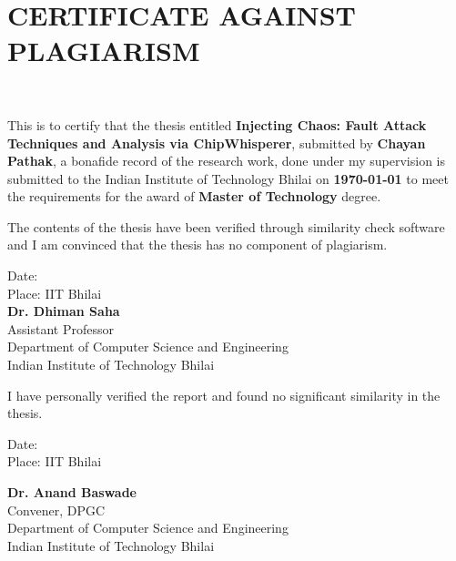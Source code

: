 \chapter[Approval]{CERTIFICATE AGAINST PLAGIARISM}


\hspace{0pt plus 1filll} \\
  
 \begin{Spacing}{1}
 	\sffamily
 	
\noindent 	
This is to certify that the thesis entitled \textbf{Injecting Chaos: Fault Attack Techniques and Analysis via ChipWhisperer}, submitted by \textbf{Chayan Pathak}, a bonafide record of the research work, done under my supervision is submitted to the Indian Institute of Technology Bhilai on {\bfseries \today} to meet the requirements for the award of {\bfseries Master of Technology} degree.

The contents of the thesis have been verified through similarity check software and I am convinced that the thesis has no component of plagiarism.\\

\vspace{1em}
\setlength{}
\begin{multicols}{2}
\noindent
Date:\\
Place: IIT Bhilai\\


\columnbreak
\noindent
{\bfseries Dr. Dhiman Saha}\\
Assistant Professor\\
Department of Computer Science and Engineering\\
Indian Institute of Technology Bhilai
\end{multicols}

\vspace{0.8em}
I have personally verified the report and found no significant similarity in the thesis.\\

\vspace{1em}
\setlength{}
\begin{multicols}{2}
\noindent
Date:\\
Place: IIT Bhilai\\


\columnbreak
\noindent

{\bfseries Dr. Anand Baswade}\\
Convener, DPGC\\
Department of Computer Science and Engineering\\
Indian Institute of Technology Bhilai
\end{multicols}

\end{Spacing}